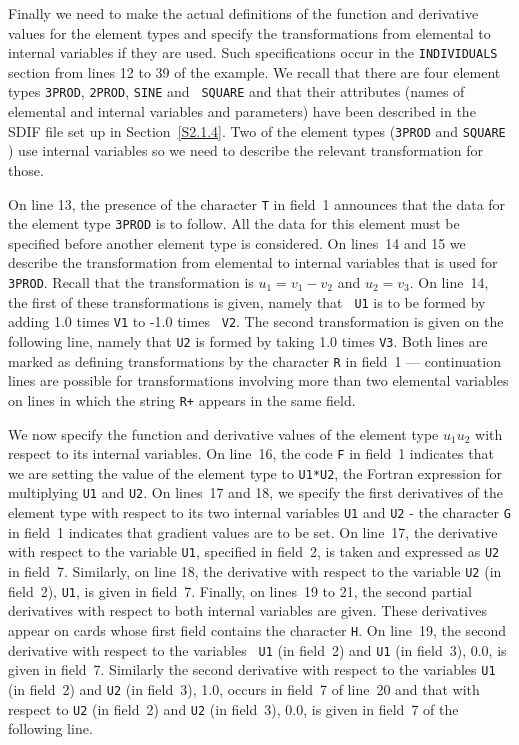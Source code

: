\documentclass[a4paper]{article}
\begin{document}
Finally we need to  make  the actual definitions  of the  function and
derivative
values for the element  types  and specify  the  transformations
from elemental to internal variables
if they are used.  Such specifications
occur in the {\tt INDIVIDUALS}
section from lines 12 to 39 of the example.  We  recall that there are
four  element types
{\tt 3PROD},  {\tt  2PROD},  {\tt  SINE} and  {\tt
SQUARE} and  that  their attributes (names of elemental   and internal
variables and parameters)
have been described  in the SDIF file set up
in  Section~\ref{S2.1.4}.  Two  of the element types ({\tt  3PROD} and
{\tt SQUARE}  ) use internal   variables so  we need to   describe the
relevant transformation for those.

On line 13, the presence of the character {\tt T} in field~1 announces
that the data for the  element type
{\tt  3PROD} is to follow. All the
data for this element must be specified before another element type is
considered. On  lines~14 and 15 we  describe  the  transformation from
elemental to internal  variables that is used  for {\tt 3PROD}. Recall
that the  transformation  is  $u_1  = v_1   - v_2$ and  $u_2= v_3$. On
line~14, the first of these transformations is given, namely that {\tt
U1} is to be formed by adding  1.0 times {\tt  V1} to -1.0  times {\tt
V2}.  The second transformation
is given on the following line, namely
that {\tt U2} is formed by  taking 1.0 times {\tt  V3}. Both lines are
marked as defining transformations by the character {\tt R}
in field~1 ---  continuation lines
are   possible  for transformations
involving more than two elemental variables on lines  in which the
string {\tt R+}
appears in the same field.

We now specify the function and derivative values
of the element type
$u_1 u_2$  with respect to its internal variables.
On line~16, the code
{\tt F}
in field~1 indicates that we are setting the value of the element type
to {\tt U1*U2}, the Fortran
expression for multiplying  {\tt U1}  and
{\tt U2}.  On lines~17 and 18, we specify the first derivatives of the
element type
with  respect to its two  internal variables
{\tt U1} and
{\tt U2} - the character {\tt G}
in field~1 indicates that gradient
values are  to be set.  On line~17,
the derivative
with respect to  the variable  {\tt  U1}, specified in
field~2, is taken and expressed as {\tt U2}  in field~7. Similarly, on
line 18, the  derivative with  respect to  the  variable {\tt U2}  (in
field~2), {\tt U1}, is given in field~7.  Finally, on lines~19  to 21,
the second partial derivatives
with respect to both internal variables
are  given.  These  derivatives appear   on  cards
whose  first  field
contains the character {\tt H}.
On line~19,  the second derivative
with respect  to the variables {\tt
U1} (in field~2) and {\tt U1} (in field~3), 0.0, is given  in field~7.
Similarly the second derivative with respect to the variables {\tt U1}
(in  field~2) and {\tt U2} (in  field~3), 1.0,  occurs  in  field~7 of
line~20 and that with respect  to  {\tt U2} (in  field~2) and {\tt U2}
(in field~3), 0.0, is given in field~7 of the following line.
\end{document}
